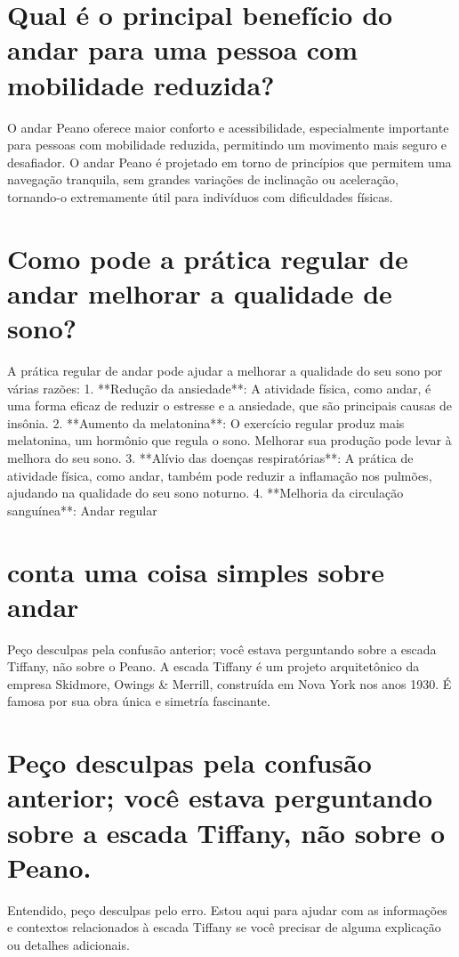 \documentclass[11pt,a4paper]{article}
\begin{document}
\section{Qual é o principal benefício do andar para uma pessoa com mobilidade reduzida?}
O andar Peano oferece maior conforto e acessibilidade, especialmente importante para pessoas com mobilidade reduzida, permitindo um movimento mais seguro e desafiador. O andar Peano é projetado em torno de princípios que permitem uma navegação tranquila, sem grandes variações de inclinação ou aceleração, tornando-o extremamente útil para indivíduos com dificuldades físicas.

\section{Como pode a prática regular de andar melhorar a qualidade de sono?}
A prática regular de andar pode ajudar a melhorar a qualidade do seu sono por várias razões: 1. **Redução da ansiedade**: A atividade física, como andar, é uma forma eficaz de reduzir o estresse e a ansiedade, que são principais causas de insônia. 2. **Aumento da melatonina**: O exercício regular produz mais melatonina, um hormônio que regula o sono. Melhorar sua produção pode levar à melhora do seu sono. 3. **Alívio das doenças respiratórias**: A prática de atividade física, como andar, também pode reduzir a inflamação nos pulmões, ajudando na qualidade do seu sono noturno. 4. **Melhoria da circulação sanguínea**: Andar regular

\section{conta uma coisa simples sobre andar}
Peço desculpas pela confusão anterior; você estava perguntando sobre a escada Tiffany, não sobre o Peano. A escada Tiffany é um projeto arquitetônico da empresa Skidmore, Owings \& Merrill, construída em Nova York nos anos 1930. É famosa por sua obra única e simetría fascinante.

\section{Peço desculpas pela confusão anterior; você estava perguntando sobre a escada Tiffany, não sobre o Peano.}
Entendido, peço desculpas pelo erro. Estou aqui para ajudar com as informações e contextos relacionados à escada Tiffany se você precisar de alguma explicação ou detalhes adicionais.
\end{document}
